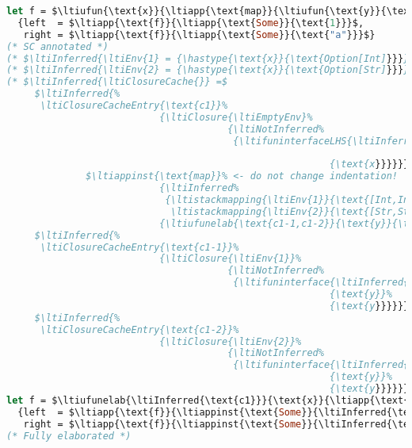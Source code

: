 {
\begin{lstlisting}[language=ml,mathescape=true]
let f = $\ltiufun{\text{x}}{\ltiapp{\text{map}}{\ltiufun{\text{y}}{\text{y}},\text{x}}}$ in
  {left  = $\ltiapp{\text{f}}{\ltiapp{\text{Some}}{\text{1}}}$,
   right = $\ltiapp{\text{f}}{\ltiapp{\text{Some}}{\text{"a"}}}$}
(* SC annotated *)
(* $\ltiInferred{\ltiEnv{1} = {\hastype{\text{x}}{\text{Option[Int]}}}}$ *)
(* $\ltiInferred{\ltiEnv{2} = {\hastype{\text{x}}{\text{Option[Str]}}}}$ *)
(* $\ltiInferred{\ltiClosureCache{}} =$
     $\ltiInferred{%
      \ltiClosureCacheEntry{\text{c1}}%
                           {\ltiClosure{\ltiEmptyEnv}%
                                       {\ltiNotInferred%
                                        {\ltifuninterfaceLHS{\ltiInferred{\ltiIFn{\ltiFn{\text{Option[Int]}}{\text{Option[Int]}}%
                                                                                  \ltiFn{\text{Option[Str]}}{\text{Option[Str]}}}}}%
                                                         {\text{x}}}}}}$
              $\ltiappinst{\text{map}}% <- do not change indentation!
                           {\ltiInferred%
                            {\ltistackmapping{\ltiEnv{1}}{\text{[Int,Int]}},%
                             \ltistackmapping{\ltiEnv{2}}{\text{[Str,Str]}}}}%
                           {\ltiufunelab{\text{c1-1,c1-2}}{\text{y}}{\text{y}},\text{x}}$
     $\ltiInferred{%
      \ltiClosureCacheEntry{\text{c1-1}}%
                           {\ltiClosure{\ltiEnv{1}}%
                                       {\ltiNotInferred%
                                        {\ltifuninterface{\ltiInferred{\ltiFn{\text{Int}}{\text{Int}}}}%
                                                         {\text{y}}%
                                                         {\text{y}}}}}}$
     $\ltiInferred{%
      \ltiClosureCacheEntry{\text{c1-2}}%
                           {\ltiClosure{\ltiEnv{2}}%
                                       {\ltiNotInferred%
                                        {\ltifuninterface{\ltiInferred{\ltiFn{\text{Str}}{\text{Str}}}}%
                                                         {\text{y}}%
                                                         {\text{y}}}}}}$ *)
let f = $\ltiufunelab{\ltiInferred{\text{c1}}}{\text{x}}{\ltiapp{\text{map}}{\ltiufunelab{\ltiInferred{\text{c1-1,c1-2}}}{\text{y}}{\text{y}},\text{x}}}$ in
  {left  = $\ltiapp{\text{f}}{\ltiappinst{\text{Some}}{\ltiInferred{\text{Int}}}{\text{1}}}$,
   right = $\ltiapp{\text{f}}{\ltiappinst{\text{Some}}{\ltiInferred{\text{Str}}}{\text{"a"}}}$}
(* Fully elaborated *)

\end{lstlisting}}
